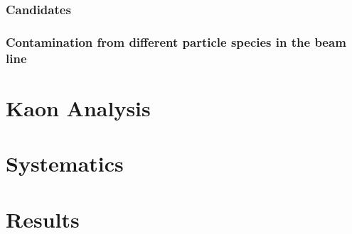 \subsubsection{Candidates}\label{sec:Candidates}
\subsubsection{Contamination from different particle species in the beam line }\label{sec:Contamination}
\section{Kaon Analysis} \label{sec:kaonAnalysis} 
\section{Systematics} \label{sec:Systematics} 
\section{Results}\label{sec:Results}
